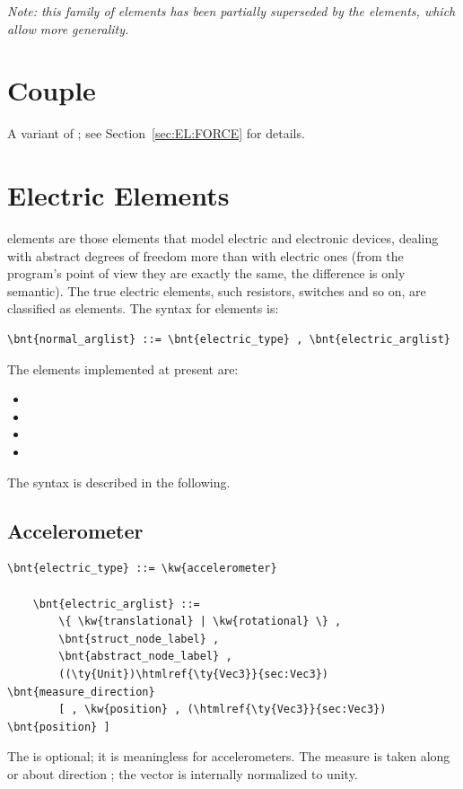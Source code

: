 {\em Note: this family of elements has been partially superseded by the
 elements, which allow more generality.}




\section{Couple}
A variant of ; see Section~\ref{sec:EL:FORCE} for details.




\section{Electric Elements}
 elements are those elements that model electric and electronic
devices, dealing with abstract degrees of freedom more than with electric
ones (from the program's point of view they are exactly the same, the
difference is only semantic). The true electric elements, such resistors,
switches and so on, are classified as  elements.
The syntax for  elements is:
\begin{Verbatim}[commandchars=\\\{\}]
    \bnt{normal_arglist} ::= \bnt{electric_type} , \bnt{electric_arglist}
\end{Verbatim}
The  elements implemented at present are:
\begin{itemize}
	\item {}
	\item {}
	\item {}
	\item {}
\end{itemize}
The syntax is described in the following.

\subsection{Accelerometer}
\begin{Verbatim}[commandchars=\\\{\}]
    \bnt{electric_type} ::= \kw{accelerometer}

    \bnt{electric_arglist} ::=
        \{ \kw{translational} | \kw{rotational} \} ,
        \bnt{struct_node_label} ,
        \bnt{abstract_node_label} ,
        ((\ty{Unit})\htmlref{\ty{Vec3}}{sec:Vec3}) \bnt{measure_direction}
        [ , \kw{position} , (\htmlref{\ty{Vec3}}{sec:Vec3}) \bnt{position} ]
\end{Verbatim}
The  is optional; it is meaningless for 
accelerometers.
The measure is taken along or about direction ;
the vector is internally normalized to unity.

